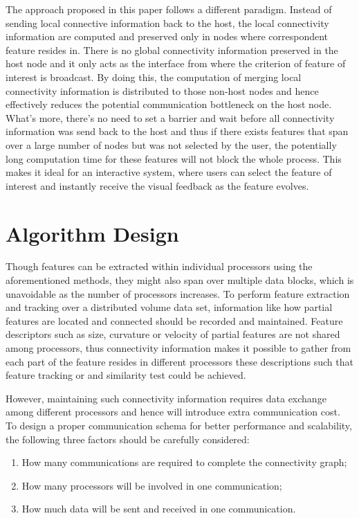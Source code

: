 \documentclass[10pt, conference, compsocconf]{IEEEtran}
\begin{document}
The approach proposed in this paper follows a different paradigm. Instead of sending local connective information back to the host, the local connectivity information are computed and preserved only in nodes where correspondent feature resides in. There is no global connectivity information preserved in the host node and it only acts as the interface from where the criterion of feature of interest is broadcast. By doing this, the computation of merging local connectivity information is distributed to those non-host nodes and hence effectively reduces the potential communication bottleneck on the host node. What's more, there's no need to set a barrier and wait before all connectivity information was send back to the host and thus if there exists features that span over a large number of nodes but was not selected by the user, the potentially long computation time for these features will not block the whole process. This makes it ideal for an interactive system, where users can select the feature of interest and instantly receive the visual feedback as the feature evolves.

\section{Algorithm Design}
Though features can be extracted within individual processors using the aforementioned methods, they might also span over multiple data blocks, which is unavoidable as the number of processors increases. To perform feature extraction and tracking over a distributed volume data set, information like how partial features are located and connected should be recorded and maintained. Feature descriptors such as size, curvature or velocity of partial features are not shared among processors, thus connectivity information makes it possible to gather from each part of the feature resides in different processors these descriptions such that feature tracking or and similarity test could be achieved. 

However, maintaining such connectivity information requires data exchange among different processors and hence will introduce extra communication cost. To design a proper communication schema for better performance and scalability, the following three factors should be carefully considered:

\begin{enumerate}
\item How many communications are required to complete the connectivity graph;
\item How many processors will be involved in one communication;
\item How much data will be sent and received in one communication.
\end{enumerate}
\end{document}
